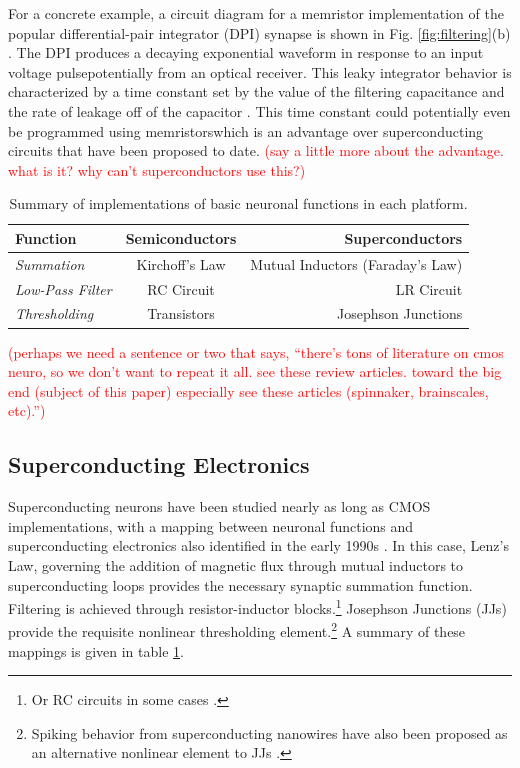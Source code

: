 \documentclass[twocolumn]{article}
\begin{document}
For a concrete example, a circuit diagram for a memristor implementation of the popular differential-pair integrator (DPI) synapse is shown in Fig. \ref{fig:filtering}(b) \cite{dalgaty2019hybrid}. The DPI produces a decaying exponential waveform in response to an input voltage pulse\textemdash potentially from an optical receiver. This leaky integrator behavior is characterized by a time constant set by the value of the filtering capacitance and the rate of leakage off of the capacitor \cite{chicca2014neuromorphic}. This time constant could potentially even be programmed using memristors\textemdash which is an advantage over superconducting circuits that have been proposed to date. \textcolor{red}{(say a little more about the advantage. what is it? why can't superconductors use this?)}

\begin{table}[h]
  \begin{center}
    \label{tab:mathtable}
    \begin{tabular}{l|c|r} %
      \textbf{Function} & \textbf{Semiconductors} & \textbf{Superconductors}\\
      \hline
      \textit{Summation} & Kirchoff's Law & Mutual Inductors (Faraday's Law)\\
      \textit{Low-Pass Filter} & RC Circuit & LR Circuit\\
      \textit{Thresholding} & Transistors & Josephson Junctions\\
    \end{tabular}
    \caption{Summary of implementations of basic neuronal functions in each platform.}
  \end{center}
\end{table}

\textcolor{red}{(perhaps we need a sentence or two that says, ``there's tons of literature on cmos neuro, so we don't want to repeat it all. see these review articles. toward the big end (subject of this paper) especially see these articles (spinnaker, brainscales, etc).'')}

\subsection{Superconducting Electronics}
Superconducting neurons have been studied nearly as long as CMOS implementations, with a mapping between neuronal functions and superconducting electronics also identified in the early 1990s \cite{hago1991, hiak1991}. In this case, Lenz's Law, governing the addition of magnetic flux through mutual inductors to superconducting loops provides the necessary synaptic summation function. Filtering is achieved through resistor-inductor blocks.\footnote{Or RC circuits in some cases \cite{crotty2010josephson}.}  Josephson Junctions (JJs) provide the requisite nonlinear thresholding element.\footnote{Spiking behavior from superconducting nanowires have also been proposed as an alternative nonlinear element to JJs \cite{toomey2019design}.} A summary of these mappings is given in table \ref{tab:mathtable}. 
\end{document}
